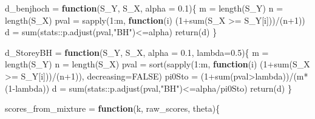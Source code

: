 \documentclass[
]{article}
\newenvironment{Shaded}{\begin{snugshade}}{\end{snugshade}}
\newcommand{\AttributeTok}[1]{\textcolor[rgb]{0.77,0.63,0.00}{#1}}
\newcommand{\ConstantTok}[1]{\textcolor[rgb]{0.00,0.00,0.00}{#1}}
\newcommand{\ControlFlowTok}[1]{\textcolor[rgb]{0.13,0.29,0.53}{\textbf{#1}}}
\newcommand{\DecValTok}[1]{\textcolor[rgb]{0.00,0.00,0.81}{#1}}
\newcommand{\FloatTok}[1]{\textcolor[rgb]{0.00,0.00,0.81}{#1}}
\newcommand{\FunctionTok}[1]{\textcolor[rgb]{0.00,0.00,0.00}{#1}}
\newcommand{\NormalTok}[1]{#1}
\newcommand{\OtherTok}[1]{\textcolor[rgb]{0.56,0.35,0.01}{#1}}
\newcommand{\SpecialCharTok}[1]{\textcolor[rgb]{0.00,0.00,0.00}{#1}}
\newcommand{\StringTok}[1]{\textcolor[rgb]{0.31,0.60,0.02}{#1}}
\begin{document}
\begin{Shaded}
\begin{Highlighting}[]
\NormalTok{d\_benjhoch }\OtherTok{=} \ControlFlowTok{function}\NormalTok{(S\_Y, S\_X, }\AttributeTok{alpha =} \FloatTok{0.1}\NormalTok{)\{}
\NormalTok{  m }\OtherTok{=} \FunctionTok{length}\NormalTok{(S\_Y)}
\NormalTok{  n }\OtherTok{=} \FunctionTok{length}\NormalTok{(S\_X)}
\NormalTok{  pval }\OtherTok{=} \FunctionTok{sapply}\NormalTok{(}\DecValTok{1}\SpecialCharTok{:}\NormalTok{m, }\ControlFlowTok{function}\NormalTok{(i) (}\DecValTok{1}\SpecialCharTok{+}\FunctionTok{sum}\NormalTok{(S\_X }\SpecialCharTok{\textgreater{}=}\NormalTok{ S\_Y[i]))}\SpecialCharTok{/}\NormalTok{(n}\SpecialCharTok{+}\DecValTok{1}\NormalTok{))}
\NormalTok{  d }\OtherTok{=}  \FunctionTok{sum}\NormalTok{(stats}\SpecialCharTok{::}\FunctionTok{p.adjust}\NormalTok{(pval,}\StringTok{"BH"}\NormalTok{)}\SpecialCharTok{\textless{}=}\NormalTok{alpha)}
  \FunctionTok{return}\NormalTok{(d)}
\NormalTok{\}}






\NormalTok{d\_StoreyBH }\OtherTok{=} \ControlFlowTok{function}\NormalTok{(S\_Y, S\_X, }\AttributeTok{alpha =} \FloatTok{0.1}\NormalTok{, }\AttributeTok{lambda=}\FloatTok{0.5}\NormalTok{)\{}
\NormalTok{  m }\OtherTok{=} \FunctionTok{length}\NormalTok{(S\_Y)}
\NormalTok{  n }\OtherTok{=} \FunctionTok{length}\NormalTok{(S\_X)}
\NormalTok{  pval }\OtherTok{=} \FunctionTok{sort}\NormalTok{(}\FunctionTok{sapply}\NormalTok{(}\DecValTok{1}\SpecialCharTok{:}\NormalTok{m, }\ControlFlowTok{function}\NormalTok{(i) (}\DecValTok{1}\SpecialCharTok{+}\FunctionTok{sum}\NormalTok{(S\_X }\SpecialCharTok{\textgreater{}=}\NormalTok{ S\_Y[i]))}\SpecialCharTok{/}\NormalTok{(n}\SpecialCharTok{+}\DecValTok{1}\NormalTok{)), }\AttributeTok{decreasing=}\ConstantTok{FALSE}\NormalTok{)}
\NormalTok{  pi0Sto }\OtherTok{=}\NormalTok{ (}\DecValTok{1}\SpecialCharTok{+}\FunctionTok{sum}\NormalTok{(pval}\SpecialCharTok{\textgreater{}}\NormalTok{lambda))}\SpecialCharTok{/}\NormalTok{(m}\SpecialCharTok{*}\NormalTok{(}\DecValTok{1}\SpecialCharTok{{-}}\NormalTok{lambda))}
\NormalTok{  d }\OtherTok{=}  \FunctionTok{sum}\NormalTok{(stats}\SpecialCharTok{::}\FunctionTok{p.adjust}\NormalTok{(pval,}\StringTok{"BH"}\NormalTok{)}\SpecialCharTok{\textless{}=}\NormalTok{alpha}\SpecialCharTok{/}\NormalTok{pi0Sto)}
  \FunctionTok{return}\NormalTok{(d)}
\NormalTok{\}}





\NormalTok{scores\_from\_mixture }\OtherTok{=} \ControlFlowTok{function}\NormalTok{(k, raw\_scores, theta)\{}


\end{Highlighting}
\end{Shaded}
\end{document}

